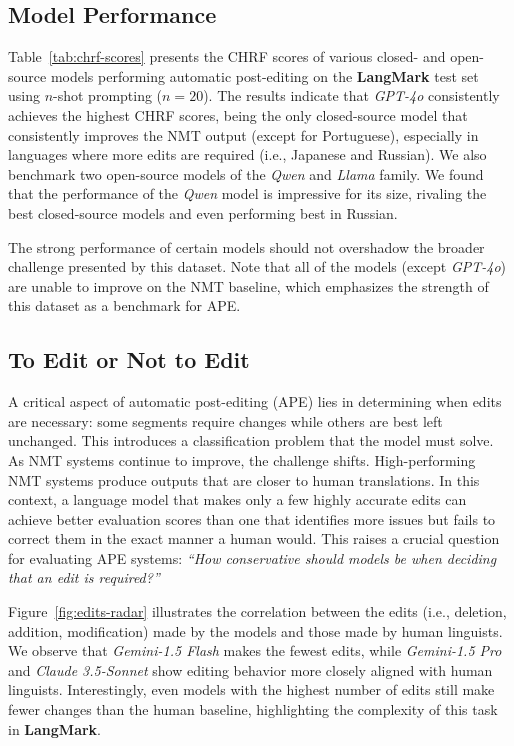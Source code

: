 \documentclass[11pt]{article}
\theoremstyle{plain}
\theoremstyle{definition}
\theoremstyle{remark}
\begin{document}
\subsection{Model Performance} 
Table~\ref{tab:chrf-scores} presents the CHRF scores of various closed- and open-source models performing automatic post-editing on the \textbf{LangMark} test set using $n$-shot prompting ($n=20$). The results indicate that \textit{GPT-4o} consistently achieves the highest CHRF scores, being the only closed-source model that consistently improves the NMT output (except for Portuguese), especially in languages where more edits are required (i.e., Japanese and Russian). We also benchmark two open-source models of the \textit{Qwen} and \textit{Llama} family. We found that the performance of the \textit{Qwen} model is impressive for its size, rivaling the best closed-source models and even performing best in Russian. 

The strong performance of certain models should not overshadow the broader challenge presented by this dataset. Note that all of the models (except \textit{GPT-4o}) are unable to improve on the NMT baseline, which emphasizes the strength of this dataset as a benchmark for APE.

\subsection{To Edit or Not to Edit}
A critical aspect of automatic post-editing (APE) lies in determining when edits are necessary: some segments require changes while others are best left unchanged. This introduces a classification problem that the model must solve. As NMT systems continue to improve, the challenge shifts. High-performing NMT systems produce outputs that are closer to human translations. In this context, a language model that makes only a few highly accurate edits can achieve better evaluation scores than one that identifies more issues but fails to correct them in the exact manner a human would. This raises a crucial question for evaluating APE systems: \emph{``How conservative should models be when deciding that an edit is required?''} 


Figure~\ref{fig:edits-radar} illustrates the correlation between the edits (i.e., deletion, addition, modification) made by the models and those made by human linguists. We observe that \textit{Gemini-1.5 Flash} makes the fewest edits, while \textit{Gemini-1.5 Pro} and \textit{Claude 3.5-Sonnet} show editing behavior more closely aligned with human linguists. Interestingly, even models with the highest number of edits still make fewer changes than the human baseline, highlighting the complexity of this task in \textbf{LangMark}.
\end{document}
